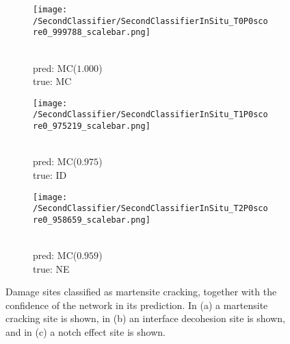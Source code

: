 
\begin{figure}[H]
\centering
\begin{subfigure}{0.3\textwidth}
\texttt{[image: /SecondClassifier/SecondClassifierInSitu\_T0P0score0\_999788\_scalebar.png]}
\caption{\\pred: MC($1.000$) \\ true: MC}
\label{sub:InSituMartensiteSamplesM}
\end{subfigure}
\begin{subfigure}{0.3\textwidth}
\texttt{[image: /SecondClassifier/SecondClassifierInSitu\_T1P0score0\_975219\_scalebar.png]}
\caption{\\pred: MC($0.975$) \\ true: ID}
\label{sub:InSituMartensiteSamplesI}
\end{subfigure}
\begin{subfigure}{0.3\textwidth}
\texttt{[image: /SecondClassifier/SecondClassifierInSitu\_T2P0score0\_958659\_scalebar.png]}
\caption{\\pred: MC($0.959$) \\ true: NE}
\label{sub:InSituMartensiteSamplesN}
\end{subfigure}
\caption{Damage sites classified as martensite cracking, together with the confidence of the network in its prediction. In (a) a martensite cracking site is shown, in (b) an interface decohesion site is shown, and in (c) a notch effect site is shown. }
\label{fig:InSituMartensiteSamples}
\end{figure}

